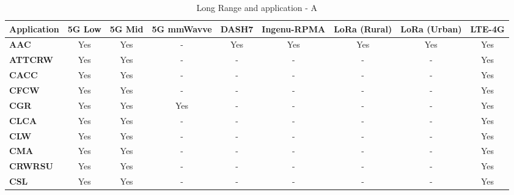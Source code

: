 
\begin{table}[ht!]
\centering
\caption{Long Range and application - A}
    \label{fig:techandapplong}
\begin{tabular}{lcccccccc}
\hline
\textbf{Application} & \textbf{5G Low} & \textbf{5G Mid} & \textbf{5G mmWavve} & \textbf{DASH7} & \textbf{Ingenu-RPMA} & \textbf{LoRa (Rural)} & \textbf{LoRa (Urban)} & \textbf{LTE-4G} \\
\hline
\textbf{AAC}         & Yes             & Yes             & -                   & Yes            & Yes                  & Yes                   & Yes                   & Yes             \\
\textbf{ATTCRW}      & Yes             & Yes             & -                   & -              & -                    & -                     & -                     & Yes             \\
\textbf{CACC}        & Yes             & Yes             & -                   & -              & -                    & -                     & -                     & Yes             \\
\textbf{CFCW}        & Yes             & Yes             & -                   & -              & -                    & -                     & -                     & Yes             \\
\textbf{CGR}         & Yes             & Yes             & Yes                 & -              & -                    & -                     & -                     & Yes             \\
\textbf{CLCA}        & Yes             & Yes             & -                   & -              & -                    & -                     & -                     & Yes             \\
\textbf{CLW}         & Yes             & Yes             & -                   & -              & -                    & -                     & -                     & Yes             \\
\textbf{CMA}         & Yes             & Yes             & -                   & -              & -                    & -                     & -                     & Yes             \\
\textbf{CRWRSU}      & Yes             & Yes             & -                   & -              & -                    & -                     & -                     & Yes             \\
\textbf{CSL}         & Yes             & Yes             & -                   & -              & -                    & -                     & -                     & Yes             \\

\end{tabular}
\end{table}
